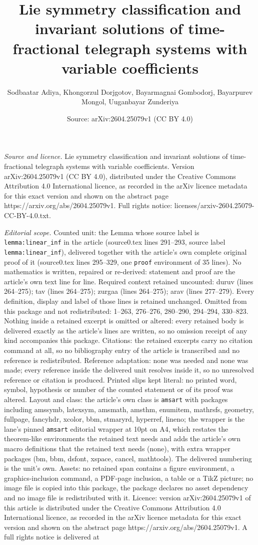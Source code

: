 \documentclass[10pt,a4paper]{amsart}
\title[Lie symmetry classification and invariant solutions of time-]{Lie symmetry classification and invariant solutions of time-fractional telegraph systems with variable coefficients}
\author{Sodbaatar Adiya, Khongorzul Dorjgotov, Bayarmagnai Gombodorj, Bayarpurev Mongol, Uuganbayar Zunderiya}
\date{Source: arXiv:2604.25079v1 (CC BY 4.0)}
\begin{document}
\maketitle

\noindent\emph{Source and licence.} Lie symmetry classification and invariant solutions of time-fractional telegraph systems with variable coefficients. Version arXiv:2604.25079v1 (CC BY 4.0), distributed under the Creative Commons Attribution 4.0 International licence, as recorded in the arXiv licence metadata for this exact version and shown on the abstract page https://arxiv.org/abs/2604.25079v1. Full rights notice: licenses/arxiv-2604.25079-CC-BY-4.0.txt.\par\smallskip

\noindent\textit{Editorial scope.} Counted unit: the Lemma whose source label is \texttt{lemma:linear\_inf} in the article (source0.tex lines 291--293, source label \texttt{lemma:linear\_inf}), delivered together with the article's own complete original proof of it (source0.tex lines 295--329, one \texttt{proof} environment of 35 lines). No mathematics is written, repaired or re-derived: statement and proof are the article's own text line for line. Required context retained uncounted: duruv (lines 264--275); tav (lines 264--275); zurgaa (lines 264--275); arav (lines 277--279). Every definition, display and label of those lines is retained unchanged. Omitted from this package and not redistributed: 1--263, 276--276, 280--290, 294--294, 330--823. Nothing inside a retained excerpt is omitted or altered: every retained body is delivered exactly as the article's lines are written, so no omission receipt of any kind accompanies this package. Citations: the retained excerpts carry no citation command at all, so no bibliography entry of the article is transcribed and no reference is redistributed. Reference adaptation: none was needed and none was made; every reference inside the delivered unit resolves inside it, so no unresolved reference or citation is produced. Printed slips kept literal: no printed word, symbol, hypothesis or number of the counted statement or of its proof was altered. Layout and class: the article's own class is \texttt{amsart} with packages including amssymb, latexsym, amsmath, amsthm, enumitem, mathrsfs, geometry, fullpage, fancyhdr, xcolor, bbm, stmaryrd, hyperref, lineno; the wrapper is the lane's pinned \texttt{amsart} editorial wrapper at 10pt on A4, which restates the theorem-like environments the retained text needs and adds the article's own macro definitions that the retained text needs (none), with extra wrapper packages (bm, bbm, dsfont, xspace, cancel, mathtools). The delivered numbering is the unit's own. Assets: no retained span contains a figure environment, a graphics-inclusion command, a PDF-page inclusion, a table or a TikZ picture; no image file is copied into this package, the package declares no asset dependency and no image file is redistributed with it. Licence: version arXiv:2604.25079v1 of this article is distributed under the Creative Commons Attribution 4.0 International licence, as recorded in the arXiv licence metadata for this exact version and shown on the abstract page https://arxiv.org/abs/2604.25079v1. A full rights notice is delivered at 
\end{document}
